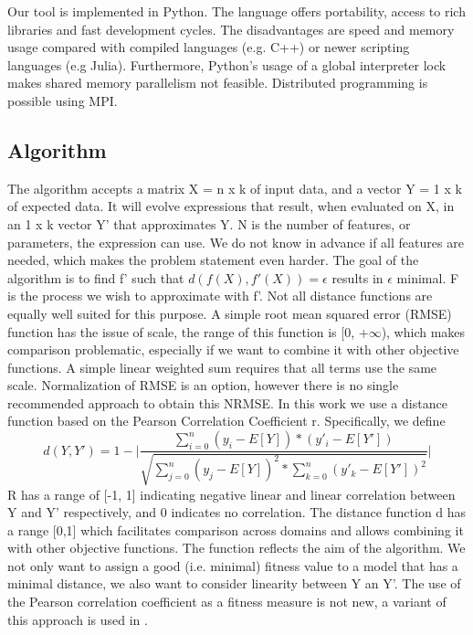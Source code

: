 Our tool is implemented in Python. The language offers portability, access to rich libraries and fast development cycles. The disadvantages are speed and memory usage compared with compiled languages (e.g. C++) or newer scripting languages (e.g Julia).
Furthermore, Python's usage of a global interpreter lock makes shared memory parallelism not feasible. Distributed programming is possible using MPI.
\subsection{Algorithm}
The algorithm accepts a matrix X = n x k of input data, and a vector Y = 1 x k of expected data. It will evolve expressions that result, when evaluated on X, in an 1 x k vector Y' that approximates Y. N is the number of features, or parameters, the expression can use. We do not know in advance if all features are needed, which makes the problem statement even harder.
The goal of the algorithm is to find f' such that
$
d(f(X), f'(X))=\epsilon
$
results in $\epsilon$ minimal. F is the process we wish to approximate with f'.
Not all distance functions are equally well suited for this purpose. A simple root mean squared error (RMSE) function has the issue of scale, the range of this function is [0, +$\infty$), which makes comparison problematic, especially if we want to combine it with other objective functions. A simple linear weighted sum requires that all terms use the same scale.
Normalization of RMSE is an option, however there is no single recommended approach to obtain this NRMSE.
In this work we use a distance function based on the Pearson Correlation Coefficient r. Specifically, we define
\[
d(Y, Y') = 1 - 
\lvert \frac{\sum_{i=0}^{n}{(y_i-E[Y])*(y'_i-E[Y'])}}{\sqrt{\sum_{j=0}^{n}{(y_j-E[Y])^2}*\sum_{k=0}^{n}{(y'_k-E[Y'])^2}}}
 \lvert 
 \]
R has a range of [-1, 1] indicating negative linear and linear correlation between Y and Y' respectively, and 0 indicates no correlation. The distance function d has a range [0,1] which facilitates comparison across domains and allows combining it with other objective functions. The function reflects the aim of the algorithm. We not only want to assign a good (i.e. minimal) fitness value to a model that has a minimal distance, we also want to consider linearity between Y an Y'. The use of the Pearson correlation coefficient as a fitness measure is not new, a variant of this approach is used in \citep{pearson}.
